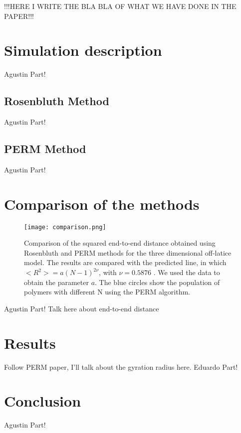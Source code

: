 \documentclass[aps,prl,reprint,groupedaddress]{revtex4-1}
\begin{document}
!!!HERE I WRITE THE BLA BLA OF WHAT WE HAVE DONE IN THE PAPER!!!

\section{Simulation description \label{description}}
Agustin Part!

\subsection{Rosenbluth Method}
Agustin Part!

\subsection{PERM Method}
Agustin Part!

\section{Comparison of the methods}

\begin{figure}[ht]
	\texttt{[image: comparison.png]}
	\caption{Comparison of the squared end-to-end distance obtained using Rosenbluth and PERM methods for the three dimensional off-latice model. The results are compared with the predicted line, in which $<R^2> = a(N-1)^{2 \nu}$, with $\nu = 0.5876$ \cite{Clisby2010}. We used the data to obtain the parameter $a$. The blue circles show the population of polymers with different N using the PERM algorithm. \label{comparison}}
\end{figure}

Agustin Part! Talk here about end-to-end distance

\section{Results}

Follow PERM paper, I'll talk about the gyration radius here.
Eduardo Part!

\section{Conclusion \label{conclusion}}
Agustin Part!


\end{document}
